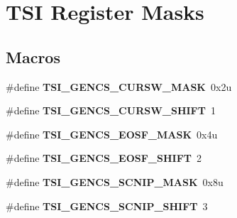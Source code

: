 \hypertarget{group___t_s_i___register___masks}{}\section{T\+SI Register Masks}
\label{group___t_s_i___register___masks}
\subsection*{Macros}
\begin{DoxyCompactItemize}
\item 
\mbox{\label{group___t_s_i___register___masks_gafd7d98d809a1d17c59cc86addc5fe801}} 
\#define {\bfseries T\+S\+I\+\_\+\+G\+E\+N\+C\+S\+\_\+\+C\+U\+R\+S\+W\+\_\+\+M\+A\+SK}~0x2u
\item 
\mbox{\label{group___t_s_i___register___masks_gadcd854b12f8b747a492eac3e88522b1e}} 
\#define {\bfseries T\+S\+I\+\_\+\+G\+E\+N\+C\+S\+\_\+\+C\+U\+R\+S\+W\+\_\+\+S\+H\+I\+FT}~1
\item 
\mbox{\label{group___t_s_i___register___masks_ga820de7fe1ecba9a42260e304554b389f}} 
\#define {\bfseries T\+S\+I\+\_\+\+G\+E\+N\+C\+S\+\_\+\+E\+O\+S\+F\+\_\+\+M\+A\+SK}~0x4u
\item 
\mbox{\label{group___t_s_i___register___masks_ga9a2e8c68bfb60312ebdeea4f069d9086}} 
\#define {\bfseries T\+S\+I\+\_\+\+G\+E\+N\+C\+S\+\_\+\+E\+O\+S\+F\+\_\+\+S\+H\+I\+FT}~2
\item 
\mbox{\label{group___t_s_i___register___masks_gaf7212a89bc45902f2ed4cee12a1ceb92}} 
\#define {\bfseries T\+S\+I\+\_\+\+G\+E\+N\+C\+S\+\_\+\+S\+C\+N\+I\+P\+\_\+\+M\+A\+SK}~0x8u
\item 
\mbox{\label{group___t_s_i___register___masks_ga372b92d46c9f071d4fdee3edcc0d5219}} 
\#define {\bfseries T\+S\+I\+\_\+\+G\+E\+N\+C\+S\+\_\+\+S\+C\+N\+I\+P\+\_\+\+S\+H\+I\+FT}~3
\item 
\mbox{\label{group___t_s_i___register___masks_ga490fa9afb2591596712216cc7031cd47}} 

\end{DoxyCompactItemize}
